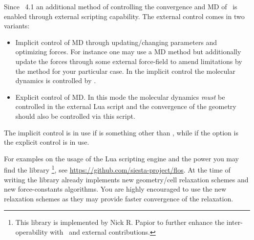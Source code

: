 Since \siesta\ 4.1 an additional method of controlling the convergence
and MD of \siesta\ is enabled through external scripting
capability. The external control comes in two variants:
\begin{itemize}
  \item Implicit control of MD through updating/changing parameters
  and optimizing forces. For instance one may use a  MD
  method but additionally update the forces through some external
  force-field to amend limitations by the  method for
  your particular case. In the implicit control the molecular dynamics
  is controlled by \siesta.

  \item Explicit control of MD. In this mode the molecular dynamics
  \emph{must} be controlled in the external Lua script and the
  convergence of the geometry should also be controlled via this
  script.

\end{itemize}

The implicit control is in use if  is something
other than , while if the option is  the explicit
control is in use.

For examples on the usage of the Lua scripting engine and the power
you may find the library \footnote{This library is
    implemented by Nick R. Papior to further enhance the
    inter-operability with \siesta\ and external contributions.}, see
\url{https://github.com/siesta-project/flos}. At the time of writing
the  library already implements new geometry/cell
relaxation schemes and new force-constants algorithms. You are highly
encouraged to use the new relaxation schemes as they may provide
faster convergence of the relaxation.

